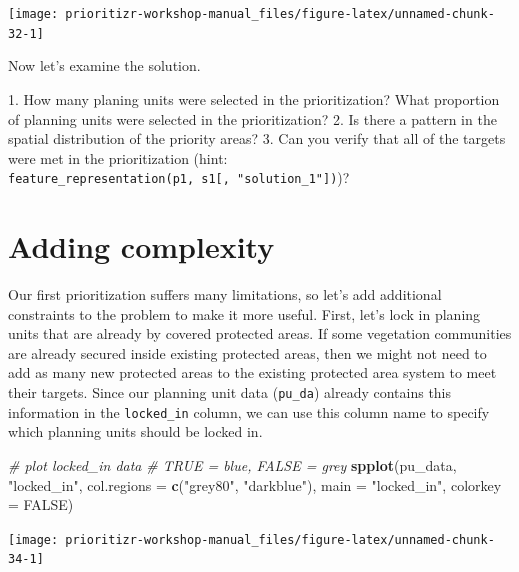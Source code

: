 \documentclass[12pt,]{book}
\makeatletter
\newenvironment{Shaded}{\begin{snugshade}}{\end{snugshade}}
\newcommand{\KeywordTok}[1]{\textcolor[rgb]{0.13,0.29,0.53}{\textbf{#1}}}
\newcommand{\DataTypeTok}[1]{\textcolor[rgb]{0.13,0.29,0.53}{#1}}
\newcommand{\StringTok}[1]{\textcolor[rgb]{0.31,0.60,0.02}{#1}}
\newcommand{\CommentTok}[1]{\textcolor[rgb]{0.56,0.35,0.01}{\textit{#1}}}
\newcommand{\OtherTok}[1]{\textcolor[rgb]{0.56,0.35,0.01}{#1}}
\newcommand{\NormalTok}[1]{#1}
\newenvironment{kframe}{%
\medskip{}
\setlength{\fboxsep}{.8em}
 \def\at@end@of@kframe{}%
 \ifinner\ifhmode%
  \def\at@end@of@kframe{\end{minipage}}%
  \begin{minipage}{\columnwidth}%
 \fi\fi%
 \def\FrameCommand##1{\hskip\@totalleftmargin \hskip-\fboxsep
 \colorbox{shadecolor}{##1}\hskip-\fboxsep
     \hskip-\linewidth \hskip-\@totalleftmargin \hskip\columnwidth}%
 \MakeFramed {\advance\hsize-\width
   \@totalleftmargin\z@ \linewidth\hsize
   \@setminipage}}%
 {\par\unskip\endMakeFramed%
 \at@end@of@kframe}
\newenvironment{rmdblock}[1]
  {
  \begin{itemize}
  \renewcommand{\labelitemi}{
    \raisebox{-.7\height}[0pt][0pt]{
      {\setkeys{Gin}{width=3em,keepaspectratio}\texttt{[image: images/\#1]}}
    }
  }
  \setlength{\fboxsep}{1em}
  \begin{kframe}
  \item
  }
  {
  \end{kframe}
  \end{itemize}
  }
\newenvironment{rmdquestion}
  {\begin{rmdblock}{question}}
  {\end{rmdblock}}
\makeatother
\begin{document}
\begin{center}\texttt{[image: prioritizr-workshop-manual\_files/figure-latex/unnamed-chunk-32-1]} \end{center}

Now let's examine the solution.

\begin{rmdquestion} 1. How many planing units were selected in
the prioritization? What proportion of planning units were selected in
the prioritization? 2. Is there a pattern in the spatial distribution of
the priority areas? 3. Can you verify that all of the targets were met
in the prioritization (hint:
\texttt{feature\_representation(p1,\ s1{[},\ "solution\_1"{]})})?
\end{rmdquestion}

\section{Adding complexity}\label{adding-complexity}

Our first prioritization suffers many limitations, so let's add
additional constraints to the problem to make it more useful. First,
let's lock in planing units that are already by covered protected areas.
If some vegetation communities are already secured inside existing
protected areas, then we might not need to add as many new protected
areas to the existing protected area system to meet their targets. Since
our planning unit data (\texttt{pu\_da}) already contains this
information in the \texttt{locked\_in} column, we can use this column
name to specify which planning units should be locked in.

\begin{Shaded}
\begin{Highlighting}[]
\CommentTok{# plot locked_in data}
\CommentTok{# TRUE = blue, FALSE = grey}
\KeywordTok{spplot}\NormalTok{(pu_data, }\StringTok{"locked_in"}\NormalTok{, }\DataTypeTok{col.regions =} \KeywordTok{c}\NormalTok{(}\StringTok{"grey80"}\NormalTok{, }\StringTok{"darkblue"}\NormalTok{),}
       \DataTypeTok{main =} \StringTok{"locked_in"}\NormalTok{, }\DataTypeTok{colorkey =} \OtherTok{FALSE}\NormalTok{)}
\end{Highlighting}
\end{Shaded}

\begin{center}\texttt{[image: prioritizr-workshop-manual\_files/figure-latex/unnamed-chunk-34-1]} \end{center}
\end{document}
